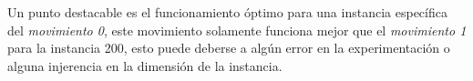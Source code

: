 Un punto destacable es el funcionamiento óptimo para una instancia específica del \textit{movimiento 0}, este movimiento solamente funciona mejor que el \textit{movimiento 1} para la instancia 200, esto puede deberse a algún error en la experimentación o alguna injerencia en la dimensión de la instancia.

